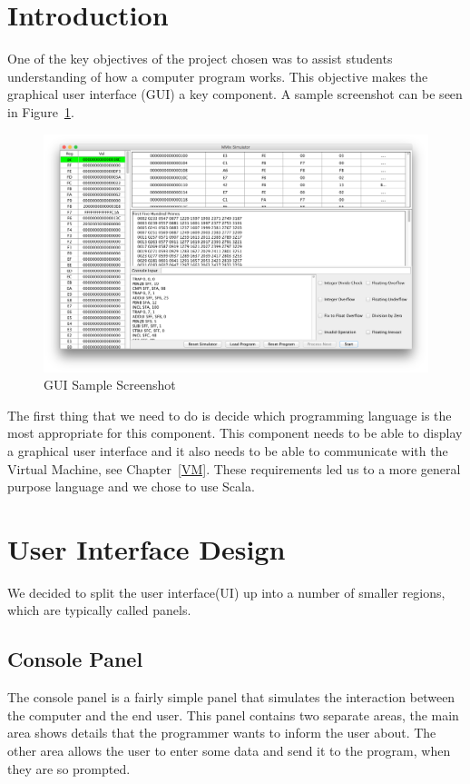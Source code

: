 \documentclass[a4paper,11pt]{report}
\begin{document}
\section{Introduction}
One of the key objectives of the project chosen was to assist students understanding of how a computer program works. This objective makes the graphical user interface (GUI) a key component. A sample screenshot can be seen in Figure~\ref{screenshot}.
\begin{figure}[ht!]
\centering
\includegraphics[width=\textwidth]{GUISample3}
\caption{GUI Sample Screenshot}
\label{screenshot}
\end{figure}

The first thing that we need to do is decide which programming language is the most appropriate for this component. This component needs to be able to display a graphical user interface and it also needs to be able to communicate with the Virtual Machine, see Chapter~\ref{VM}. These requirements led us to a more general purpose language and we chose to use Scala.
\section{User Interface Design}
We decided to split the user interface(UI) up into a number of smaller regions, which are typically called panels. 
\subsection{Console Panel}
The console panel is a fairly simple panel that simulates the interaction between the computer and the end user. This panel contains two separate areas, the main area shows details that the programmer wants to inform the user about. The other area allows the user to enter some data and send it to the program, when they are so prompted.
\end{document}

